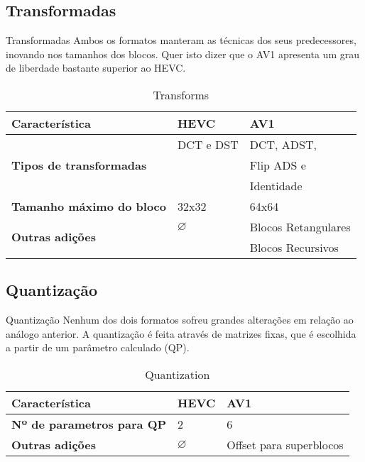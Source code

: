\documentclass{beamer}
\begin{document}
\subsection{Transformadas}
\begin{frame}{Transformadas}
	Ambos os formatos manteram as técnicas dos seus predecessores, inovando nos tamanhos dos blocos. Quer isto dizer que o AV1 apresenta um grau de liberdade bastante superior ao HEVC.
	\begin{table}
		\centering
		\begin{tabular}{l|l|l}
			\textbf{Característica} 													& \textbf{HEVC} 	& \textbf{AV1} \\\hline
			\multirow{3}{*}{\textbf{Tipos de transformadas}} 	& DCT e DST 			& DCT, ADST, \\
																												&									& Flip ADS e \\
																												&									& Identidade \\
			\textbf{Tamanho máximo do bloco} 									& 32x32		 				& 64x64 \\
			\multirow{2}{*}{\textbf{Outras adições}}					& $\varnothing$		& Blocos Retangulares \\
			 																									&									& Blocos Recursivos \\
		\end{tabular}
		\caption{\label{tab:transforms}Transforms}
	\end{table}
\end{frame}

\subsection{Quantização}
\begin{frame}{Quantização}
	Nenhum dos dois formatos sofreu grandes alterações em relação ao análogo anterior. A quantização é feita através de matrizes fixas, que é escolhida a partir de um parâmetro calculado (QP).
	\begin{table}
		\centering
		\begin{tabular}{l|l|l}
			\textbf{Característica} 													& \textbf{HEVC} 	& \textbf{AV1} \\\hline
			\textbf{Nº de parametros para QP}									& 2					 			& 6 \\
			\textbf{Outras adições}														& $\varnothing$		& Offset para superblocos \\
		\end{tabular}
		\caption{\label{tab:quantization}Quantization}
	\end{table}
\end{frame}
\end{document}
